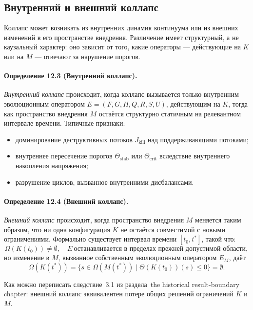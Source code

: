 \subsection{Внутренний и внешний коллапс}

Коллапс может возникать из внутренних динамик континуума или из внешних
изменений в его пространстве внедрения. Различение имеет структурный, а не
каузальный характер: оно зависит от того, какие операторы — действующие на \(K\)
или на \(M\) — отвечают за нарушение порогов.

\paragraph{Определение 12.3 (Внутренний коллапс).}
\emph{Внутренний коллапс} происходит, когда коллапс вызывается только
внутренним эволюционным оператором \(E=(F,G,H,Q,R,S,U)\), действующим на
\(K\), тогда как пространство внедрения \(M\) остаётся структурно
статичным на релевантном интервале времени. Типичные признаки:
\begin{itemize}
  \item доминирование деструктивных потоков \(J_{\mathrm{kill}}\) над
        поддерживающими потоками;
  \item внутреннее пересечение порогов \(\Theta_{\mathrm{stab}}\) или
        \(\Theta_{\mathrm{crit}}\) вследствие внутреннего накопления
        напряжения;
  \item разрушение циклов, вызванное внутренними дисбалансами.
\end{itemize}

\paragraph{Определение 12.4 (Внешний коллапс).}
\emph{Внешний коллапс} происходит, когда пространство внедрения \(M\)
меняется таким образом, что ни одна конфигурация \(K\) не остаётся совместимой
с новыми ограничениями. Формально существует интервал времени
\([t_0,t^{\ast}]\), такой что:
\[
  \Omega(K(t_0))\neq\emptyset,
  \quad
  E\ \text{останавливается в пределах прежней допустимой области},
\]
но изменение в \(M\), вызванное собственным эволюционным оператором \(E_M\),
даёт
\[
  \Omega(K(t^{\ast})) =
    \big\{ s \in \Omega(M(t^{\ast})) \mid
           \Theta(K(t_0))(s)\le 0 \big\} = \emptyset.
\]

Как можно переписать следствие~3.1 из раздела~the historical result-boundary chapter:
внешний коллапс эквивалентен потере общих решений ограничений \(K\) и \(M\).

